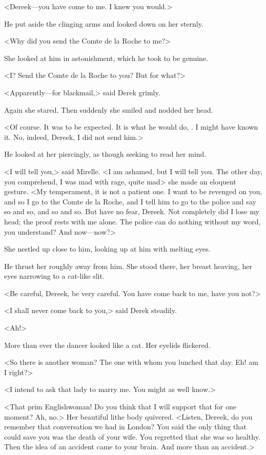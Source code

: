 <Dereek—you have come to me. I knew you would.>

He put aside the clinging arms and looked down on her sternly.

<Why did you send the Comte de la Roche to me?>

She looked at him in astonishment, which he took to be genuine.

<I? Send the Comte de la Roche to you? But for what?>

<Apparently—for blackmail,> said Derek grimly.

Again she stared. Then suddenly she smiled and nodded her head.

<Of course. It was to be expected. It is what he would do, . I might have known it. No, indeed, Dereek, I did not send him.>

He looked at her piercingly, as though seeking to read her mind.

<I will tell you,> said Mirelle. <I am ashamed, but I will tell you. The other day, you comprehend, I was mad with rage, quite mad\longdash> she made an eloquent gesture. <My temperament, it is not a patient one. I want to be revenged on you, and so I go to the Comte de la Roche, and I tell him to go to the police and say so and so, and so and so. But have no fear, Dereek. Not completely did I lose my head; the proof rests with me alone. The police can do nothing without my word, you understand? And now—now?>

She nestled up close to him, looking up at him with melting eyes.

He thrust her roughly away from him. She stood there, her breast heaving, her eyes narrowing to a cat-like slit.

<Be careful, Dereek, be very careful. You have come back to me, have you not?>

<I shall never come back to you,> said Derek steadily.

<Ah!>

More than ever the dancer looked like a cat. Her eyelids flickered.

<So there is another woman? The one with whom you lunched that day. Eh! am I right?>

<I intend to ask that lady to marry me. You might as well know.>

<That prim Englishwoman! Do you think that I will support that for one moment? Ah, no.> Her beautiful lithe body quivered. <Listen, Dereek, do you remember that conversation we had in London? You said the only thing that could save you was the death of your wife. You regretted that she was so healthy. Then the idea of an accident came to your brain. And more than an accident.>

